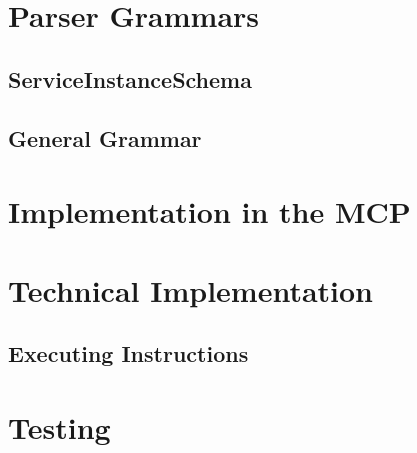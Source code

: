\section{Parser Grammars}

\subsection{ServiceInstanceSchema}		%
\subsection{General Grammar}			%

\section{Implementation in the MCP}




\section{Technical Implementation}
\subsection{Executing Instructions}

\section{Testing}


